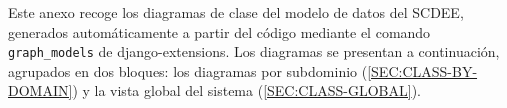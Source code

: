 Este anexo recoge los diagramas de clase del modelo de datos del SCDEE,
generados automáticamente a partir del código mediante el comando
\texttt{graph\_models} de django-extensions. Los diagramas se presentan
a continuación, agrupados en dos bloques: los diagramas por subdominio
(\cref{SEC:CLASS-BY-DOMAIN}) y la vista global del sistema
(\cref{SEC:CLASS-GLOBAL}).
